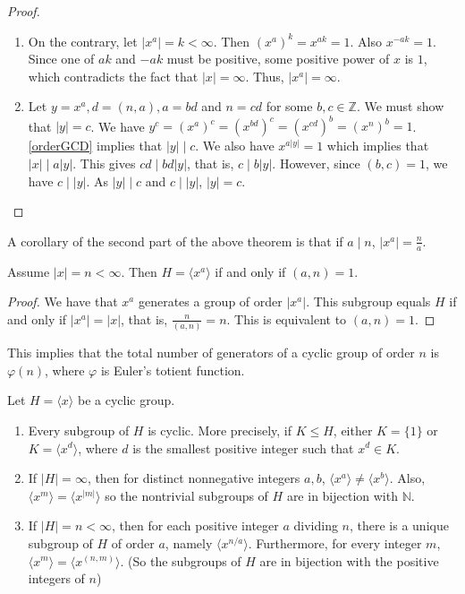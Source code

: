 \begin{proof}
    \phantom{owo}
    \begin{enumerate}
        \item On the contrary, let $|x^a|=k<\infty$. Then $(x^a)^k=x^{ak}=1$. Also $x^{-ak}=1$. Since one of $ak$ and $-ak$ must be positive, some positive power of $x$ is $1$, which contradicts the fact that $|x|=\infty$. Thus, $|x^a|=\infty$.
        \item Let $y=x^a, d=(n,a), a=bd$ and $n=cd$ for some $b,c\in\mathbb{Z}$. We must show that $|y|=c$. We have $y^c=(x^a)^c=(x^{bd})^c=(x^{cd})^b=(x^n)^b=1$. \ref{orderGCD} implies that $|y|\mid c$. We also have $x^{a|y|}=1$ which implies that $|x|\mid a|y|$. This gives $cd\mid bd|y|$, that is, $c\mid b|y|$. However, since $(b,c)=1$, we have $c\mid |y|$. As $|y|\mid c$ and $c\mid |y|$, $|y|=c$.
    \end{enumerate}
\end{proof}

\begin{corollary}
\label{ifDivThenOrderIsDiv}
    A corollary of the second part of the above theorem is that if $a\mid n$, $|x^a|=\frac na$.
\end{corollary}

\begin{exercise}
    Assume $|x|=n<\infty$. Then $H=\langle x^a\rangle$ if and only if $(a,n)=1$.
\end{exercise}
\begin{proof}
    We have that $x^a$ generates a group of order $|x^a|$. This subgroup equals $H$ if and only if $|x^a|=|x|$, that is, $\frac{n}{(a,n)}=n$. This is equivalent to $(a,n)=1$.
\end{proof}

This implies that the total number of generators of a cyclic group of order $n$ is $\varphi(n)$, where $\varphi$ is Euler's totient function.

\begin{theorem}
    Let $H=\langle x\rangle$ be a cyclic group.
    \begin{enumerate}
        \item Every subgroup of $H$ is cyclic. More precisely, if $K\leq H$, either $K=\{1\}$ or $K=\langle x^d\rangle$, where $d$ is the smallest positive integer such that $x^d\in K$.
        \item If $|H|=\infty$, then for distinct nonnegative integers $a,b$, $\langle x^a\rangle\neq\langle x^b\rangle$. Also, $\langle x^m\rangle=\langle x^{|m|}\rangle$ so the nontrivial subgroups of $H$ are in bijection with $\mathbb{N}$.
        \item If $|H|=n<\infty$, then for each positive integer $a$ dividing $n$, there is a unique subgroup of $H$ of order $a$, namely $\langle x^{n/a}\rangle$. Furthermore, for every integer $m$, $\langle x^m\rangle=\langle x^{(n,m)}\rangle$. (So the subgroups of $H$ are in bijection with the positive integers of $n$)
    \end{enumerate}
\end{theorem}

